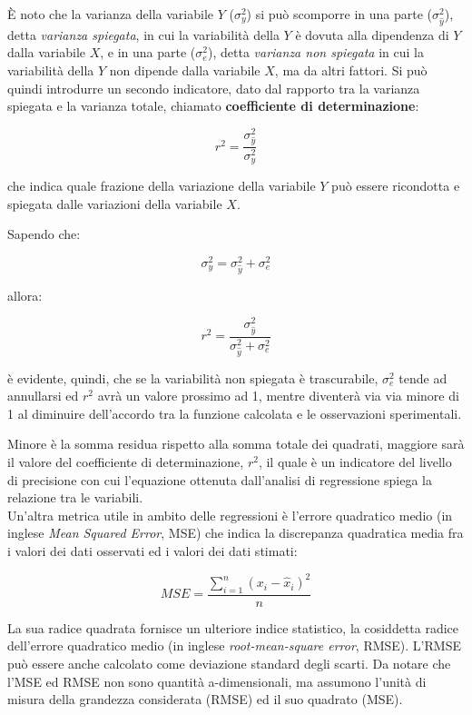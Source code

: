 È noto che la varianza della variabile $Y$ ($\sigma_{y}^{2}$) si può scomporre in una parte ($\sigma_{\hat{y}}^{2}$), detta \textit{varianza spiegata}, in cui la variabilità della $Y$ è dovuta alla dipendenza di $Y$ dalla variabile $X$, e in una parte ($\sigma_{e}^{2}$), detta \textit{varianza non spiegata} in cui la  variabilità della $Y$ non dipende dalla variabile $X$, ma da altri fattori. Si può quindi introdurre un secondo indicatore, dato dal rapporto tra la varianza spiegata e la varianza totale, chiamato \textbf{coefficiente di determinazione}:

$$r^{2}=\frac{\sigma_{\hat{y}}^{2}}{\sigma_{y}^{2}}$$\smallskip

che indica quale frazione della variazione della variabile $Y$ può essere ricondotta e spiegata dalle variazioni della variabile $X$.

Sapendo che:

$$\sigma_{y}^{2}=\sigma_{\hat{y}}^{2}+\sigma_{e}^{2}$$

allora:

$$r^{2}=\frac{\sigma_{\hat{y}}^{2}}{\sigma_{\hat{y}}^{2}+\sigma_{e}^{2}}$$\smallskip

è evidente, quindi, che se la variabilità non spiegata è trascurabile, $\sigma_{e}^{2}$ tende ad annullarsi ed $r^{2}$ avrà un valore prossimo ad 1, mentre diventerà via via minore di 1 al diminuire dell’accordo tra la funzione calcolata e le osservazioni sperimentali.

Minore è la somma residua rispetto alla somma totale dei quadrati, maggiore sarà il valore del coefficiente di determinazione, $r^2$, il quale è un indicatore del livello di precisione con cui l'equazione ottenuta dall'analisi di regressione spiega la relazione tra le variabili. \cite{linear_models}\\

Un'altra metrica utile in ambito delle regressioni è l'errore quadratico medio (in inglese \textit{Mean Squared Error}, MSE) che indica la discrepanza quadratica media fra i valori dei dati osservati ed i valori dei dati stimati:

$$MSE=\frac{\sum_{i=1}^{n}\left(x_{i}-\widehat{x}_{i}\right)^{2}}{n}$$\smallskip

La sua radice quadrata fornisce un ulteriore indice statistico, la cosiddetta radice dell'errore quadratico medio (in inglese \textit{root-mean-square error}, RMSE). L'RMSE può essere anche calcolato come deviazione standard degli scarti. Da notare che l'MSE ed RMSE non sono quantità a-dimensionali, ma assumono l'unità di misura della grandezza considerata (RMSE) ed il suo quadrato (MSE). 

